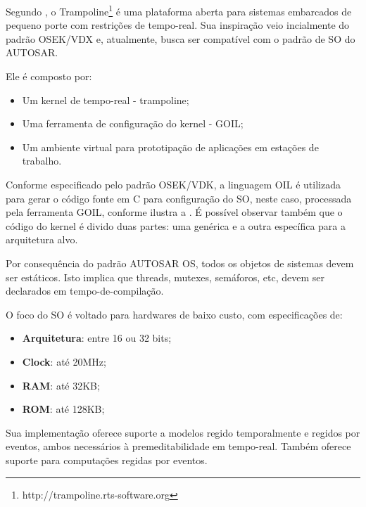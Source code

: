 Segundo , o Trampoline\footnote{http://trampoline.rts-software.org} é uma plataforma aberta para sistemas embarcados de pequeno porte com restrições de tempo-real. Sua inspiração veio incialmente do padrão OSEK/VDX e, atualmente, busca ser compatível com o padrão de SO do AUTOSAR.

Ele é composto por:
\begin{itemize}
	\item Um kernel de tempo-real - trampoline;
	\item Uma ferramenta de configuração do kernel - GOIL;
	\item Um ambiente virtual para prototipação de aplicações em estações de trabalho.
\end{itemize}

Conforme especificado pelo padrão OSEK/VDK, a linguagem OIL é utilizada para gerar o código fonte em C para configuração do SO, neste caso, processada pela ferramenta GOIL, conforme ilustra a . É possível observar também que o código do kernel é divido duas partes: uma genérica e a outra específica para a arquitetura alvo.


Por consequência do padrão AUTOSAR OS, todos os objetos de sistemas devem ser estáticos. Isto implica que threads, mutexes, semáforos, etc, devem ser declarados em tempo-de-compilação.

O foco do SO é voltado para hardwares de baixo custo, com especificações de:
\begin{itemize}
	\item \textbf{Arquitetura}: entre 16 ou 32 bits;
	\item \textbf{Clock}: até 20MHz;
	\item \textbf{RAM}: até 32KB;
	\item \textbf{ROM}:	até 128KB;	
\end{itemize}

Sua implementação oferece suporte a modelos regido temporalmente e regidos por eventos, ambos necessários à premeditabilidade em tempo-real. Também oferece suporte para computações regidas por eventos.